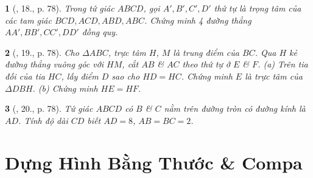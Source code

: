 \documentclass{article}
\newtheorem{baitoan}{}
\begin{document}
\begin{baitoan}[\cite{Binh_Toan_8_tap_1}, 18., p. 78]
	Trong tứ giác $ABCD$, gọi $A',B',C',D'$ thứ tự là trọng tâm của các tam giác $BCD,ACD,ABD,ABC$. Chứng minh 4 đường thẳng $AA',BB',CC',DD'$ đồng quy.
\end{baitoan}

\begin{baitoan}[\cite{Binh_Toan_8_tap_1}, 19., p. 78]
	Cho $\Delta ABC$, trực tâm $H$, $M$ là trung điểm của $BC$. Qua $H$ kẻ đường thẳng vuông góc với $HM$, cắt $AB$ \& $AC$ theo thứ tự ở $E$ \& $F$. (a) Trên tia đối của tia $HC$, lấy điểm $D$ sao cho $HD = HC$. Chứng minh $E$ là trực tâm của $\Delta DBH$. (b) Chứng minh $HE = HF$.
\end{baitoan}

\begin{baitoan}[\cite{Binh_Toan_8_tap_1}, 20., p. 78]
	Tứ giác $ABCD$ có $B$ \& $C$ nằm trên đường tròn có đường kính là $AD$. Tính độ dài $CD$ biết $AD = 8$, $AB = BC = 2$.
\end{baitoan}


\section{Dựng Hình Bằng Thước \& Compa}


\printbibliography[heading=bibintoc]
	
\end{document}
